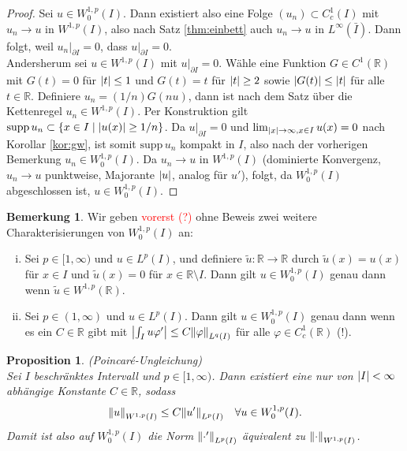 \documentclass[twoside]{article}
\newtheorem{proposition}[theorem]{Proposition}
\theoremstyle{definition}
\newtheorem{remark}[theorem]{Bemerkung}
\begin{document}
\begin{proof}
Sei $u \in W^{1,p}_0(I)$. Dann existiert also eine Folge $(u_n) \subset C_c^1(I)$ mit $u_n \to u$ in $W^{1,p}(I)$, also nach Satz \ref{thm:einbett} auch $u_n \to u$ in $L^\infty(\bar{I})$. Dann folgt, weil $u_n|_{\partial I} = 0$, dass $u|_{\partial I} = 0$.\\

Andersherum sei $u \in W^{1,p}(I)$ mit $u|_{\partial I} = 0$. Wähle eine Funktion $G \in C^1(\mathbb{R})$ mit $G(t) = 0$ für $\abs{t} \leq 1$ und $G(t) = t$ für $\abs{t} \geq 2$ sowie $\abs{G(t)} \leq \abs{t}$ für alle $t \in \mathbb{R}$. Definiere $u_n = (1/n)G(nu)$, dann ist nach dem Satz über die Kettenregel $u_n \in W^{1,p}(I)$. Per Konstruktion gilt $\text{supp} \, u_n \subset \{x \in I \; | \; \abs{u(x)} \geq 1/n\}$. Da $u|_{\partial I} = 0$ und $\lim_{\abs{x} \to \infty, x \in I}u(x)=0$ nach Korollar \ref{kor:gw}, ist somit $\text{supp} \, u_n$ kompakt in $I$, also nach der vorherigen Bemerkung $u_n \in W^{1,p}_0(I)$. Da $u_n \to u$ in $W^{1,p}(I)$ (dominierte Konvergenz, $u_n \to u$ punktweise, Majorante $\abs{u}$, analog für $u'$), folgt, da $W^{1,p}_0(I)$ abgeschlossen ist, $u \in W^{1,p}_0(I)$.
\end{proof}
\begin{remark}
Wir geben \textcolor{red}{vorerst (?)} ohne Beweis zwei weitere Charakterisierungen von $W^{1,p}_0(I)$ an:
\begin{enumerate}[(i)]
\item Sei $p \in [1,\infty)$ und $u \in L^p(I)$, und definiere $\tilde{u}:\mathbb{R}  \to \mathbb{R}$ durch $\tilde{u}(x) = u(x)$ für $x \in I$ und $\tilde{u}(x) = 0$ für $x \in \mathbb{R} \setminus I$. Dann gilt $u \in W^{1,p}_0(I)$ genau dann wenn $\tilde{u} \in W^{1,p}(\mathbb{R})$.
\item Sei $p \in (1,\infty)$ und $u \in L^p(I)$. Dann gilt $u \in W^{1,p}_0(I)$ genau dann wenn es ein $C \in \mathbb{R}$ gibt mit $\abs{\int_I u \varphi'} \leq C \norm{\varphi}_{L^q(I)}$ für alle $\varphi \in C_c^1(\mathbb{R})$ (!).
\end{enumerate}
\end{remark}
\begin{proposition}(Poincar{\'e}-Ungleichung)\\
Sei $I$ beschränktes Intervall und $p \in [1,\infty)$. Dann existiert eine nur von $\abs{I}< \infty$ abhängige Konstante $C\in \mathbb{R}$, sodass
\begin{align}
\norm{u}_{W^{1,p}(I)} \leq C \norm{u'}_{L^p(I)} \quad \forall u \in W^{1,p}_0(I).
\end{align}
Damit ist also auf $W^{1,p}_0(I)$ die Norm $\norm{\cdot'}_{L^{p}(I)}$ äquivalent zu $\norm{\cdot}_{W^{1,p}(I)}$.
\end{proposition}
\end{document}
